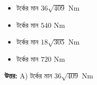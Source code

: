 \documentclass[12pt, a4paper]{article}
\begin{document}
\begin{itemize}[label={}, leftmargin=1cm, itemsep=0.5em]
    \item[\textbf{A)}] টর্কের মান $36\sqrt{409}\text{ Nm}$
    \item[\textbf{B)}] টর্কের মান $540\text{ Nm}$
    \item[\textbf{C)}] টর্কের মান $18\sqrt{305}\text{ Nm}$
    \item[\textbf{D)}] টর্কের মান $720\text{ Nm}$
\end{itemize}

\vspace{0.5em}
\begin{tcolorbox}[answerbox]
    \textbf{\color{success} উত্তর:} A) টর্কের মান $36\sqrt{409}\text{ Nm}$
\end{tcolorbox}
\vspace{1em}
\end{document}
